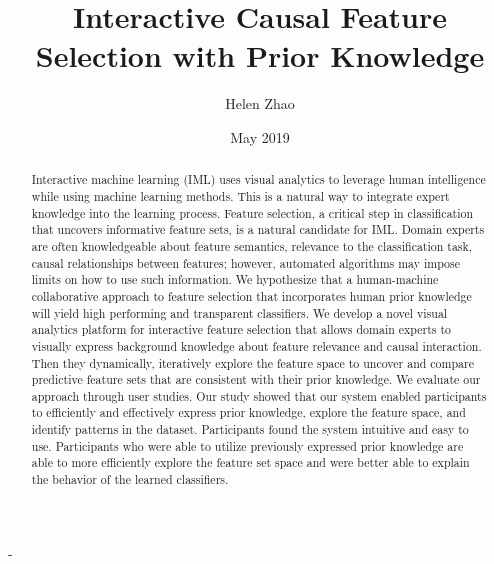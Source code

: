 \documentclass[]{cwru}
\title{Interactive Causal Feature Selection with Prior Knowledge}
\author{Helen Zhao}
\date{May 2019}
\begin{document}


\maketitle
\makeapprovalsheet

\frontmatter
\tableofcontents

\cleardoublepage
{}
{}
\listoftables

\cleardoublepage
{}
{}
\listoffigures



\begin{abstract}
Interactive machine learning (IML) uses visual analytics to leverage human intelligence while using machine learning methods. This is a natural way to integrate expert knowledge into the learning process. Feature selection, a critical step in classification that uncovers informative feature sets, is a natural candidate for IML. Domain experts are often knowledgeable about feature semantics, relevance to the classification task, causal relationships between features; however, automated algorithms may impose limits on how to use such information. We hypothesize that a human-machine collaborative approach to feature selection that incorporates human prior knowledge will yield high performing and transparent classifiers. We develop a novel visual analytics platform for interactive feature selection that allows domain experts to visually express background knowledge about feature relevance and causal interaction. Then they dynamically, iteratively explore the feature space to uncover and compare predictive feature sets that are consistent with their prior knowledge. We evaluate our approach through user studies. Our study showed that our system enabled participants to efficiently and effectively express prior knowledge, explore the feature space, and identify patterns in the dataset. Participants found the system intuitive and easy to use. Participants who were able to utilize previously expressed prior knowledge are able to more efficiently explore the feature set space and were better able to explain the behavior of the learned classifiers. 

\end{abstract}

\mainmatter


\cleardoublepage

\cleardoublepage

\cleardoublepage

\cleardoublepage

\cleardoublepage
\backmatter
\cleardoublepage
{}-


\end{document}
